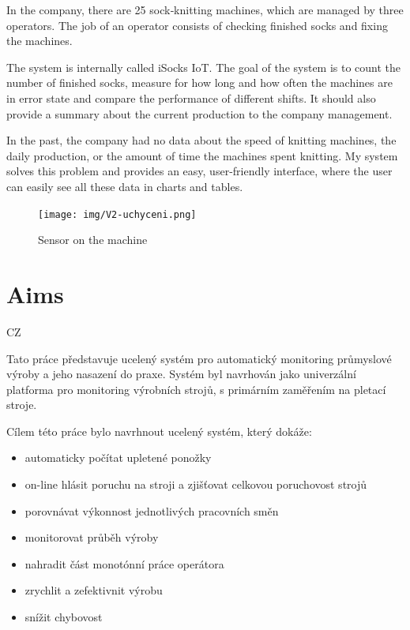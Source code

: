 \documentclass[12pt, a4paper]{article}
\begin{document}
In the company, there are 25 sock‑knitting machines, which are managed by three operators. The job of an operator consists of checking finished socks and fixing the machines.

The system is internally called iSocks IoT.
The goal of the system is to count the number of finished socks, measure for how long and how often the machines are in error state and compare the performance of different shifts.
It should also provide a summary about the current production to the company management.

In the past, the company had no data about the speed of knitting machines, the daily production, or the amount of time the machines spent knitting.
My system solves this problem and provides an easy, user-friendly interface, where the user can easily see all these data in charts and tables.

\newpage

\begin{figure}[t]
    \centering
    \texttt{[image: img/V2-uchyceni.png]}
    \caption{Sensor on the machine}
    \label{fig:SenzorNaStroji}
\end{figure}


\section*{Aims}
CZ

Tato práce představuje ucelený systém pro automatický monitoring průmyslové výroby a jeho nasazení do praxe.
Systém byl navrhován jako univerzální platforma pro monitoring výrobních strojů, s primárním zaměřením na pletací stroje.

Cílem této práce bylo navrhnout ucelený systém, který dokáže:

\begin{itemize}
    \item automaticky počítat upletené ponožky
    \item on-line hlásit poruchu na stroji a zjišťovat celkovou poruchovost strojů
    \item porovnávat výkonnost jednotlivých pracovních směn
    \item monitorovat průběh výroby
    \item nahradit část monotónní práce operátora
    \item zrychlit a zefektivnit výrobu
    \item snížit chybovost
\end{itemize}
\end{document}
